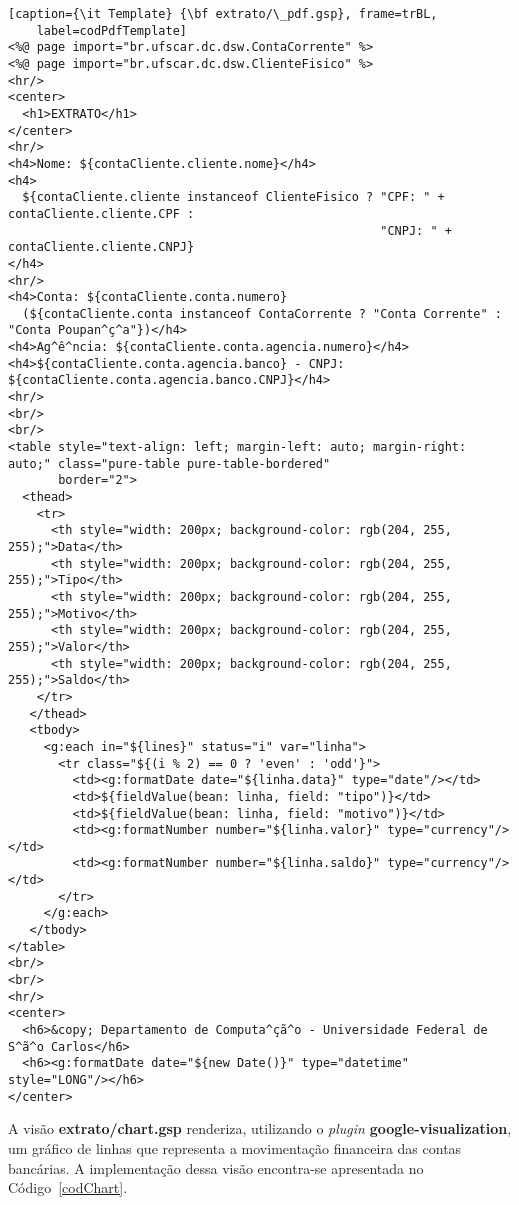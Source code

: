 \begin{lstlisting}[caption={\it Template} {\bf extrato/\_pdf.gsp}, frame=trBL,
    label=codPdfTemplate]
<%@ page import="br.ufscar.dc.dsw.ContaCorrente" %>
<%@ page import="br.ufscar.dc.dsw.ClienteFisico" %>
<hr/>
<center>
  <h1>EXTRATO</h1>
</center>
<hr/>
<h4>Nome: ${contaCliente.cliente.nome}</h4>
<h4>
  ${contaCliente.cliente instanceof ClienteFisico ? "CPF: " + contaCliente.cliente.CPF : 
                                                    "CNPJ: " + contaCliente.cliente.CNPJ}
</h4>
<hr/>
<h4>Conta: ${contaCliente.conta.numero}
  (${contaCliente.conta instanceof ContaCorrente ? "Conta Corrente" : "Conta Poupan^ç^a"})</h4>
<h4>Ag^ê^ncia: ${contaCliente.conta.agencia.numero}</h4>
<h4>${contaCliente.conta.agencia.banco} - CNPJ: ${contaCliente.conta.agencia.banco.CNPJ}</h4>
<hr/>
<br/>
<br/>
<table style="text-align: left; margin-left: auto; margin-right: auto;" class="pure-table pure-table-bordered" 
       border="2">
  <thead> 
    <tr>
      <th style="width: 200px; background-color: rgb(204, 255, 255);">Data</th>
      <th style="width: 200px; background-color: rgb(204, 255, 255);">Tipo</th>
      <th style="width: 200px; background-color: rgb(204, 255, 255);">Motivo</th>
      <th style="width: 200px; background-color: rgb(204, 255, 255);">Valor</th>
      <th style="width: 200px; background-color: rgb(204, 255, 255);">Saldo</th>
    </tr>
   </thead> 
   <tbody>
     <g:each in="${lines}" status="i" var="linha"> 
       <tr class="${(i % 2) == 0 ? 'even' : 'odd'}">
         <td><g:formatDate date="${linha.data}" type="date"/></td>
         <td>${fieldValue(bean: linha, field: "tipo")}</td>
         <td>${fieldValue(bean: linha, field: "motivo")}</td>
         <td><g:formatNumber number="${linha.valor}" type="currency"/></td>
         <td><g:formatNumber number="${linha.saldo}" type="currency"/></td>
       </tr>
     </g:each>
   </tbody>
</table>
<br/>
<br/>
<hr/>
<center>
  <h6>&copy; Departamento de Computa^çã^o - Universidade Federal de S^ã^o Carlos</h6>
  <h6><g:formatDate date="${new Date()}" type="datetime" style="LONG"/></h6>
</center>
\end{lstlisting}

A  visão  {\bf extrato/chart.gsp}  renderiza,  utilizando  o  {\it plugin}  {\bf
  google-visualization},  um gráfico  de  linhas que  representa a  movimentação
financeira  das  contas  bancárias.  A  implementação  dessa  visão  encontra-se
apresentada no Código~\ref{codChart}.  

\vspace{0.3cm}

